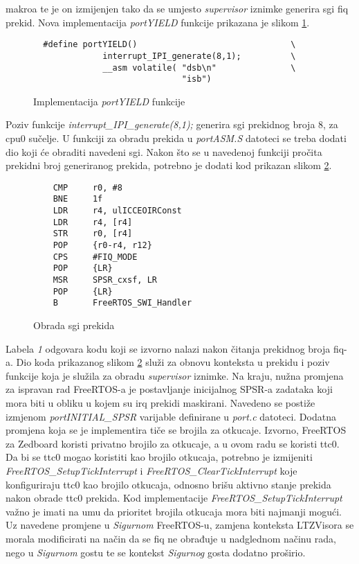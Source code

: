 \documentclass[times, utf8, diplomski, numeric]{fer}
\begin{document}
makroa te je on izmijenjen tako da se umjesto \textit{supervisor} iznimke generira \gls{sgi} \gls{fiq} prekid. Nova implementacija
\textit{portYIELD} funkcije prikazana je slikom \ref{portyield}.
\begin{figure}[H]
  \begin{lstlisting}
  #define portYIELD()                               \
              interrupt_IPI_generate(8,1);          \
              __asm volatile( "dsb\n"               \
                              "isb")
  \end{lstlisting}
  \caption{Implementacija \textit{portYIELD} funkcije}
  \label{portyield}
\end{figure}
Poziv funkcije \textit{interrupt\_IPI\_generate(8,1);} generira \gls{sgi} prekidnog broja 8, za \gls{cpu}0 sučelje. U funkciji za
obradu prekida u \textit{portASM.S} datoteci se treba dodati dio koji će obraditi navedeni \gls{sgi}. Nakon što se u navedenoj
funkciji pročita prekidni broj generiranog prekida, potrebno je dodati kod prikazan slikom \ref{sgi}.
\begin{figure}[H]
  \lstset{breaklines=true, xleftmargin=.05\textwidth}
  \begin{lstlisting}
    CMP		r0, #8
    BNE		1f
    LDR 	r4, ulICCEOIRConst
    LDR		r4, [r4]
    STR		r0, [r4]
    POP		{r0-r4, r12}
    CPS		#FIQ_MODE
    POP		{LR}
    MSR		SPSR_cxsf, LR
    POP		{LR}
    B		FreeRTOS_SWI_Handler
  \end{lstlisting}
  \caption{Obrada \gls{sgi} prekida}
  \label{sgi}
\end{figure}
Labela \textit{1} odgovara kodu koji se izvorno nalazi nakon čitanja prekidnog broja \gls{fiq}-a. Dio koda prikazanog
slikom \ref{sgi} služi za obnovu konteksta u prekidu i poziv funkcije koja je služila za obradu \textit{supervisor} iznimke.
Na kraju, nužna promjena za ispravan rad FreeRTOS-a je postavljanje inicijalnog SPSR-a zadataka koji mora biti u obliku u
kojem su \gls{irq} prekidi maskirani. Navedeno se postiže izmjenom \textit{portINITIAL\_SPSR} varijable definirane u \textit{port.c}
datoteci.
Dodatna promjena koja se je implementira tiče se brojila za otkucaje. Izvorno, FreeRTOS za Zedboard koristi privatno brojilo
za otkucaje, a u ovom radu se koristi \gls{ttc}0. Da bi se \gls{ttc}0 mogao koristiti kao brojilo otkucaja, potrebno je izmijeniti
\textit{FreeRTOS\_SetupTickInterrupt} i \textit{FreeRTOS\_ClearTickInterrupt} koje konfiguriraju \gls{ttc}0 kao brojilo otkucaja,
odnosno brišu aktivno stanje prekida nakon obrade \gls{ttc}0 prekida. Kod implementacije \textit{FreeRTOS\_SetupTickInterrupt}
važno je imati na umu da prioritet brojila otkucaja mora biti najmanji mogući.
Uz navedene promjene u \textit{Sigurnom} FreeRTOS-u, zamjena konteksta LTZVisora se morala modificirati na način da se
\gls{fiq} ne obrađuje u nadglednom načinu rada, nego u \textit{Sigurnom} gostu te se kontekst \textit{Sigurnog} gosta dodatno
proširio.
\end{document}
